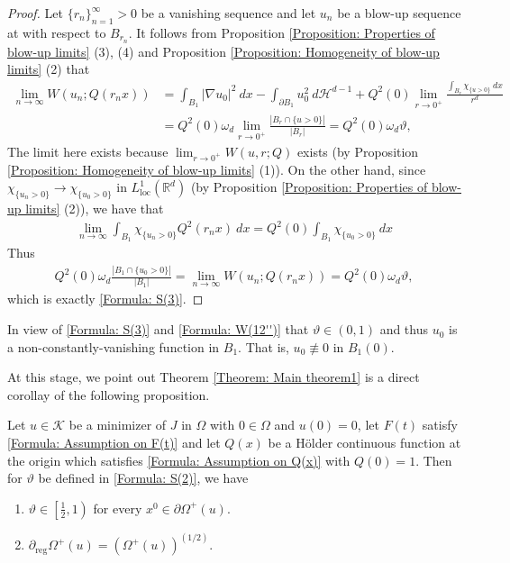 \documentclass[11pt,reqno]{amsart}
\begin{document}
\begin{proof}
	Let $\{r_{n}\}_{n=1}^{\infty}>0$ be a vanishing sequence and let $u_{n}$ be a blow-up sequence at with respect to $B_{r_{n}}$. It follows from Proposition \ref{Proposition: Properties of blow-up limits} (3), (4) and Proposition \ref{Proposition: Homogeneity of blow-up limits} (2) that
	\begin{align*}
		\lim_{n\to\infty}W(u_{n};Q(r_{n}x))&=\int_{B_{1}}|\nabla u_{0}|^{2}\:dx-\int_{\partial B_{1}}u_{0}^{2}\:d\mathcal{H}^{d-1}+Q^{2}(0)\lim_{r\to0^{+}}\frac{\int_{B_{r}}\chi_{\{u>0\}}\:dx}{r^{d}}\\
		&=Q^{2}(0)\omega_{d}\lim_{r\to0^{+}}\frac{|B_{r}\cap\{u>0\}|}{|B_{r}|}=Q^{2}(0)\omega_{d}\vartheta,
	\end{align*}
    The limit here exists because $\lim_{r\to0^{+}}W(u,r;Q)$ exists (by Proposition \ref{Proposition: Homogeneity of blow-up limits} (1)). On the other hand, since $\chi_{\{u_{n}>0\}}\to\chi_{\{u_{0}>0\}}$ in $L_{\mathrm{loc}}^{1}(\mathbb{R}^{d})$ (by Proposition \ref{Proposition: Properties of blow-up limits} (2)), we have that
    \begin{align*}
    	\lim_{n\to\infty}\int_{B_{1}}\chi_{\{u_{n}>0\}}Q^{2}(r_{n}x)\:dx=Q^{2}(0)\int_{B_{1}}\chi_{\{u_{0}>0\}}\:dx
    \end{align*}
    Thus 
    \begin{align*}
    	Q^{2}(0)\omega_{d}\frac{|B_{1}\cap\{u_{0}>0\}|}{|B_{1}|}=\lim_{n\to\infty}W(u_{n};Q(r_{n}x))=Q^{2}(0)\omega_{d}\vartheta,
    \end{align*}
    which is exactly \eqref{Formula: S(3)}.
\end{proof}
\begin{remark}\label{Remark: u_{0}notequiv0}
	In view of \eqref{Formula: S(3)} and \eqref{Formula: W(12'')} that $\vartheta\in(0,1)$ and thus $u_{0}$ is a non-constantly-vanishing function in $B_{1}$. That is, $u_{0}\not\equiv0$ in $B_{1}(0)$.
\end{remark}
At this stage, we point out Theorem \ref{Theorem: Main theorem1} is a direct corollay of the following proposition.
\begin{proposition}\label{Proposition: Density estimates}
	Let $u\in\mathcal{K}$ be a minimizer of $J$ in $\Omega$ with $0\in\Omega$ and $u(0)=0$, let $F(t)$ satisfy \eqref{Formula: Assumption on F(t)} and let $Q(x)$ be a H\"{o}lder continuous function at the origin which satisfies \eqref{Formula: Assumption on Q(x)} with $Q(0)=1$. Then for $\vartheta$ be defined in \eqref{Formula: S(2)}, we have
	\begin{enumerate}
		\item $\vartheta\in\left[\frac{1}{2},1\right)$ for every $x^{0}\in\partial\varOmega^{+}(u)$.
		\item  $\partial_{\mathrm{reg}}\varOmega^{+}(u)=(\varOmega^{+}(u))^{(1/2)}$.
	\end{enumerate}
\end{proposition}
\end{document}
